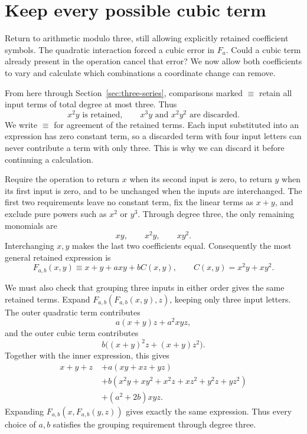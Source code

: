 \documentclass[11pt,letterpaper]{article}
\numberwithin{equation}{section}
\theoremstyle{definition}\newtheorem{example}[theorem]{Example}
\begin{document}


\section{Keep every possible cubic term}\label{sec:cubic-laws}

Return to arithmetic modulo three, still allowing explicitly retained coefficient symbols. The quadratic interaction forced a cubic error in \(F_a\). Could a cubic term already present in the operation cancel that error? We now allow both coefficients to vary and calculate which combinations a coordinate change can remove.

From here through Section~\ref{sec:three-series}, comparisons marked \(\equiv\) retain all input terms of total degree at most three. Thus
\[
 x^2y\text{ is retained},\qquad
 x^3y\text{ and }x^2y^2\text{ are discarded}.
\]
We write \(\equiv\) for agreement of the retained terms. Each input substituted into an expression has zero constant term, so a discarded term with four input letters can never contribute a term with only three. This is why we can discard it before continuing a calculation.

Require the operation to return \(x\) when its second input is zero, to return \(y\) when its first input is zero, and to be unchanged when the inputs are interchanged. The first two requirements leave no constant term, fix the linear terms as \(x+y\), and exclude pure powers such as \(x^2\) or \(y^3\). Through degree three, the only remaining monomials are
\[
 xy,\qquad x^2y,\qquad xy^2.
\]
Interchanging \(x,y\) makes the last two coefficients equal. Consequently the most general retained expression is
\begin{equation}\label{eq:general-jet}
 F_{a,b}(x,y)\equiv x+y+a xy+bC(x,y),
 \qquad C(x,y)=x^2y+xy^2.
\end{equation}

We must also check that grouping three inputs in either order gives the same retained terms. Expand \(F_{a,b}(F_{a,b}(x,y),z)\), keeping only three input letters. The outer quadratic term contributes
\[
 a(x+y)z+a^2xyz,
\]
and the outer cubic term contributes
\[
 b\bigl((x+y)^2z+(x+y)z^2\bigr).
\]
Together with the inner expression, this gives
\begin{equation}\label{eq:common-cubic-expansion}
 \begin{split}
 x+y+z\;&+a(xy+xz+yz)\\
 &+b(x^2y+xy^2+x^2z+xz^2+y^2z+yz^2)\\
 &+(a^2+2b)xyz.
 \end{split}
\end{equation}
Expanding \(F_{a,b}(x,F_{a,b}(y,z))\) gives exactly the same expression. Thus every choice of \(a,b\) satisfies the grouping requirement through degree three.
\end{document}

